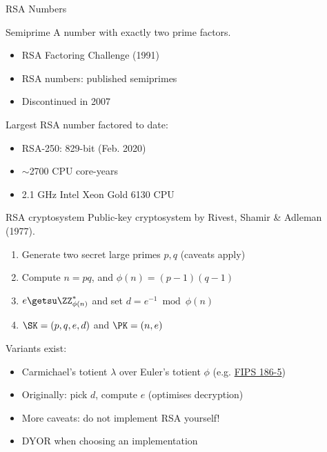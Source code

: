 \begin{frame}{RSA Numbers}
  \pause
  \begin{block}{Semiprime}
    A number with exactly two prime factors.
  \end{block}
  
  \begin{itemize}[<+(1)->]
    \item RSA Factoring Challenge (1991)
    \item RSA numbers: published semiprimes
    \item Discontinued in 2007
  \end{itemize}

  \pause
  Largest RSA number factored to date:
  \begin{itemize}[<+(1)->]
    \item RSA-250: 829-bit (Feb. 2020)
    \item $\sim$2700 CPU core-years
    \item 2.1 GHz Intel Xeon Gold 6130 CPU
  \end{itemize}
\end{frame}

\begin{frame}{RSA cryptosystem}
  Public-key cryptosystem by Rivest, Shamir \& Adleman (1977).
  
  \begin{enumerate}[<+(1)->]
    \item Generate two secret large primes $p,q$ (caveats apply)
    \item Compute $n=pq$, and $\phi(n)=(p-1)(q-1)$
    \item $e \getsu \ZZ_{\phi(n)}^*$ and set $d = e^{-1} \bmod \phi(n)$
    \item $\SK=(p,q,e,d)$ and $\PK = (n,e)$
  \end{enumerate}

  \pause
  Variants exist:
  \begin{itemize}[<+(1)->]
    \item Carmichael's totient $\lambda$ over Euler's totient $\phi$ (e.g. \href{https://csrc.nist.gov/pubs/fips/186-5/final}{FIPS 186-5})
    \item Originally: pick $d$, compute $e$ (optimises decryption)
    \item More caveats: do not implement RSA yourself!
    \item DYOR when choosing an implementation
  \end{itemize}
\end{frame}

